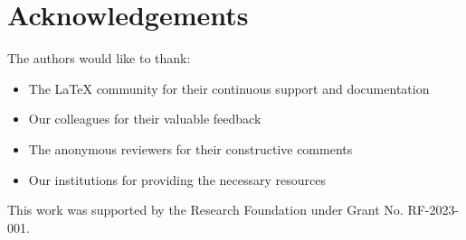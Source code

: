 \section*{Acknowledgements}
The authors would like to thank:

\begin{itemize}
    \item The LaTeX community for their continuous support and documentation
    \item Our colleagues for their valuable feedback
    \item The anonymous reviewers for their constructive comments
    \item Our institutions for providing the necessary resources
\end{itemize}

This work was supported by the Research Foundation under Grant No. RF-2023-001.
